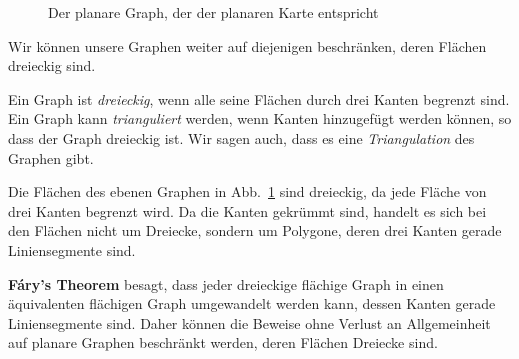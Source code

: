 \begin{figure}[t]
\begin{minipage}{.45\textwidth}
\begin{center}
\caption{Der planare Graph, der der planaren Karte entspricht}\label{f.five-planar-graph-graph}
\end{center}
\end{minipage}
\end{figure}

Wir können unsere Graphen weiter auf diejenigen beschränken, deren Flächen dreieckig sind.

\begin{definition}
Ein Graph ist \emph{dreieckig}, wenn alle seine Flächen durch drei Kanten begrenzt sind. Ein Graph kann \emph{trianguliert} werden, wenn Kanten hinzugefügt werden können, so dass der Graph dreieckig ist. Wir sagen auch, dass es eine \emph{Triangulation} des Graphen gibt.
\end{definition}

\begin{example}
Die Flächen des ebenen Graphen in Abb.~\ref{f.five-planar-graph-graph} sind dreieckig, da jede Fläche von drei Kanten begrenzt wird. Da die Kanten gekrümmt sind, handelt es sich bei den Flächen nicht um Dreiecke, sondern um Polygone, deren drei Kanten gerade Liniensegmente sind.
\end{example}

\begin{advanced}
\textbf{F\'{a}ry's Theorem} besagt, dass jeder dreieckige flächige Graph in einen äquivalenten flächigen Graph umgewandelt werden kann, dessen Kanten gerade Liniensegmente sind. Daher können die Beweise ohne Verlust an Allgemeinheit auf planare Graphen beschränkt werden, deren Flächen Dreiecke sind.
\end{advanced}


